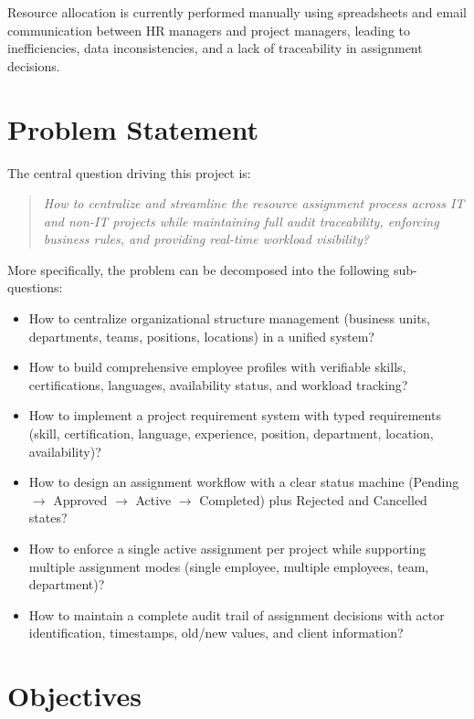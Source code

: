 \documentclass{bts-report}
\begin{document}
Resource allocation is currently performed manually using spreadsheets and email communication between HR managers and project managers, leading to inefficiencies, data inconsistencies, and a lack of traceability in assignment decisions.

\section{Problem Statement}

The central question driving this project is:

\begin{quote}
\textit{How to centralize and streamline the resource assignment process across IT and non-IT projects while maintaining full audit traceability, enforcing business rules, and providing real-time workload visibility?}
\end{quote}

More specifically, the problem can be decomposed into the following sub-questions:
\begin{itemize}
  \item How to centralize organizational structure management (business units, departments, teams, positions, locations) in a unified system?
  \item How to build comprehensive employee profiles with verifiable skills, certifications, languages, availability status, and workload tracking?
  \item How to implement a project requirement system with typed requirements (skill, certification, language, experience, position, department, location, availability)?
  \item How to design an assignment workflow with a clear status machine (Pending $\rightarrow$ Approved $\rightarrow$ Active $\rightarrow$ Completed) plus Rejected and Cancelled states?
  \item How to enforce a single active assignment per project while supporting multiple assignment modes (single employee, multiple employees, team, department)?
  \item How to maintain a complete audit trail of assignment decisions with actor identification, timestamps, old/new values, and client information?
\end{itemize}

\section{Objectives}
\end{document}
